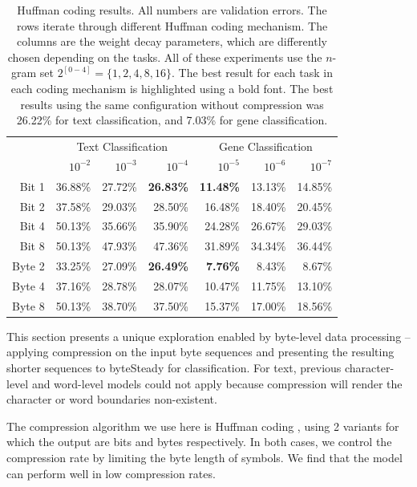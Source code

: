 \documentclass[sigconf,review, anonymous]{acmart}
\begin{document}
\begin{table}[t]
  \caption{Huffman coding results. All numbers are validation errors. The rows iterate through different Huffman coding mechanism. The columns are the weight decay parameters, which are differently chosen depending on the tasks. All of these experiments use the \(n\)-gram set \(2^{[0-4]}=\{1,2,4,8,16\}\). The best result for each task in each coding mechanism is highlighted using a bold font. The best results using the same configuration without compression was 26.22\% for text classification, and 7.03\% for gene classification.}
  \label{tab:huffman}
  \begin{center}
    \begin{tabular}{r|rrr|rrr}
      \hline
      & \multicolumn{3}{|c}{Text Classification}  & \multicolumn{3}{|c}{Gene Classification} \\
      & \(10^{-2}\) & \(10^{-3}\) & \(10^{-4}\) & \(10^{-5}\) & \(10^{-6}\) & \(10^{-7}\) \\ \hline
      Bit 1 & 36.88\% & 27.72\% & \textbf{26.83\%} & \textbf{11.48\%} & 13.13\% & 14.85\% \\
      Bit 2 & 37.58\% & 29.03\% & 28.50\% & 16.48\% & 18.40\% & 20.45\% \\
      Bit 4 & 50.13\% & 35.66\% & 35.90\% & 24.28\% & 26.67\% & 29.03\% \\
      Bit 8 & 50.13\% & 47.93\% & 47.36\% & 31.89\% & 34.34\% & 36.44\% \\ \hline
      Byte 2 & 33.25\% & 27.09\% & \textbf{26.49\%} & \textbf{7.76\%} & 8.43\% & 8.67\% \\
      Byte 4 & 37.16\% & 28.78\% & 28.07\% & 10.47\% & 11.75\% & 13.10\% \\
      Byte 8 & 50.13\% & 38.70\% & 37.50\% & 15.37\% & 17.00\% & 18.56\% \\
    \hline
    \end{tabular}
  \end{center}
\end{table}

This section presents a unique exploration enabled by byte-level data processing -- applying compression on the input byte sequences and presenting the resulting shorter sequences to byteSteady for classification. For text, previous character-level and word-level models could not apply because compression will render the character or word boundaries non-existent.

The compression algorithm we use here is Huffman coding \cite{H52}, using 2 variants for which the output are bits and bytes respectively. In both cases, we control the compression rate by limiting the byte length of symbols. We find that the model can perform well in low compression rates.
\end{document}
